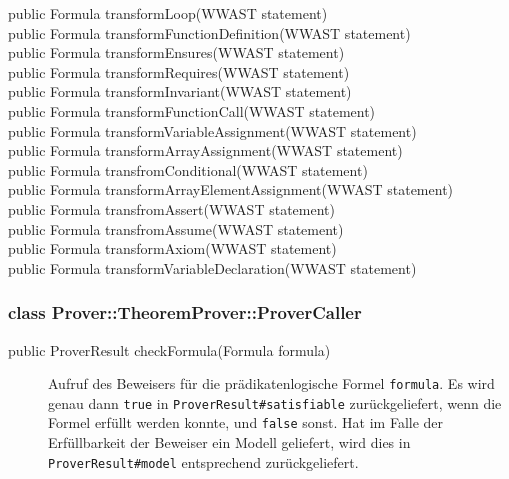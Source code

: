 \begin{description}%
    \item[public Formula transformLoop(WWAST statement)]%

    \item[public Formula transformFunctionDefinition(WWAST statement)]%

    \item[public Formula transformEnsures(WWAST statement)]%

    \item[public Formula transformRequires(WWAST statement)]%

    \item[public Formula transformInvariant(WWAST statement)]%

    \item[public Formula transformFunctionCall(WWAST statement)]%

    \item[public Formula transformVariableAssignment(WWAST statement)]%

    \item[public Formula transformArrayAssignment(WWAST statement)]%

    \item[public Formula transfromConditional(WWAST statement)]%

    \item[public Formula transformArrayElementAssignment(WWAST statement)]%

    \item[public Formula transfromAssert(WWAST statement)]%

    \item[public Formula transfromAssume(WWAST statement)]%

    \item[public Formula transformAxiom(WWAST statement)]%

    \item[public Formula transformVariableDeclaration(WWAST statement)]%

\end{description}%

\subsubsection{class Prover::TheoremProver::ProverCaller}%

\begin{description}%
    \item[public ProverResult checkFormula(Formula formula)]

    Aufruf des Beweisers für die prädikatenlogische Formel
    \texttt{formula}. Es wird genau dann \texttt{true} in
    \texttt{ProverResult\#satisfiable} zurückgeliefert, wenn die Formel
    erfüllt werden konnte, und \texttt{false} sonst. Hat im Falle der
    Erfüllbarkeit der Beweiser ein Modell geliefert, wird dies in
    \texttt{ProverResult\#model} entsprechend zurückgeliefert.%

\end{description}%

